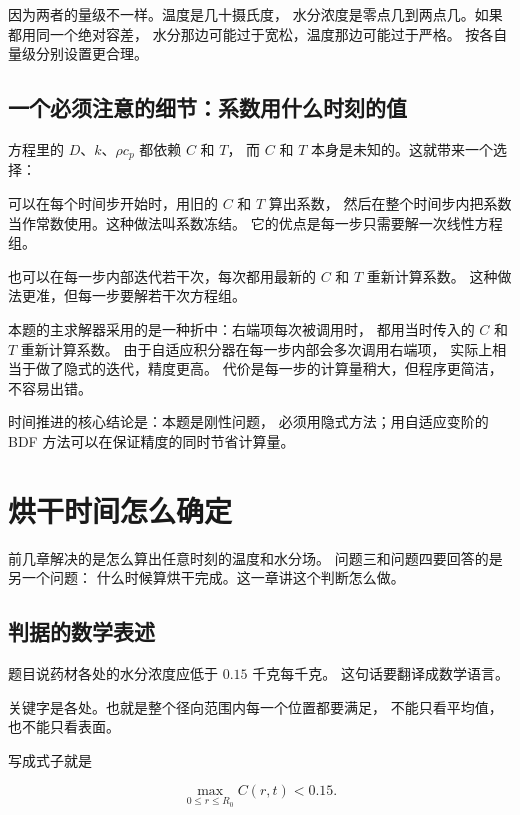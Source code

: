 因为两者的量级不一样。温度是几十摄氏度，
水分浓度是零点几到两点几。如果都用同一个绝对容差，
水分那边可能过于宽松，温度那边可能过于严格。
按各自量级分别设置更合理。

\subsection{一个必须注意的细节：系数用什么时刻的值}

方程里的 $D$、$k$、$\rho c_p$ 都依赖 $C$ 和 $T$，
而 $C$ 和 $T$ 本身是未知的。这就带来一个选择：

可以在每个时间步开始时，用旧的 $C$ 和 $T$ 算出系数，
然后在整个时间步内把系数当作常数使用。这种做法叫系数冻结。
它的优点是每一步只需要解一次线性方程组。

也可以在每一步内部迭代若干次，每次都用最新的 $C$ 和 $T$ 重新计算系数。
这种做法更准，但每一步要解若干次方程组。

本题的主求解器采用的是一种折中：右端项每次被调用时，
都用当时传入的 $C$ 和 $T$ 重新计算系数。
由于自适应积分器在每一步内部会多次调用右端项，
实际上相当于做了隐式的迭代，精度更高。
代价是每一步的计算量稍大，但程序更简洁，不容易出错。

\keypoint
时间推进的核心结论是：本题是刚性问题，
必须用隐式方法；用自适应变阶的 BDF 方法可以在保证精度的同时节省计算量。

\section{烘干时间怎么确定}

前几章解决的是怎么算出任意时刻的温度和水分场。
问题三和问题四要回答的是另一个问题：
什么时候算烘干完成。这一章讲这个判断怎么做。

\subsection{判据的数学表述}

题目说药材各处的水分浓度应低于 $0.15$ 千克每千克。
这句话要翻译成数学语言。

关键字是各处。也就是整个径向范围内每一个位置都要满足，
不能只看平均值，也不能只看表面。

写成式子就是

\begin{equation}
\max_{0\le r\le R_0}C(r,t) < 0.15 .
\end{equation}

